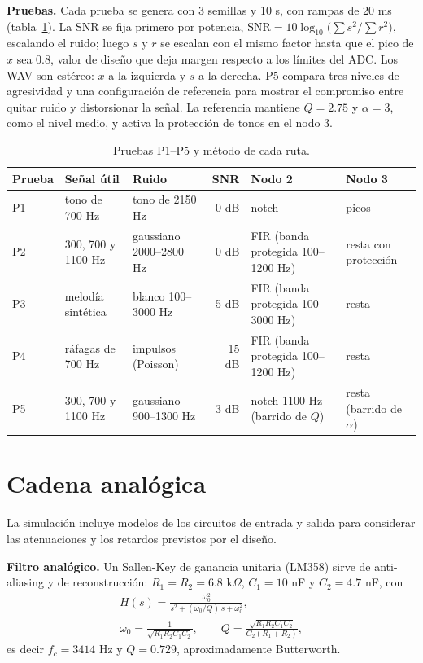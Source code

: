 \documentclass[10pt,a4paper,twocolumn]{article}
\begin{document}
\textbf{Pruebas.} Cada prueba se genera con 3 semillas y 10 s, con rampas de 20 ms (tabla~\ref{tab:pruebas}). La SNR se fija primero por potencia, $\text{SNR}=10\log_{10}\big(\sum s^2/\sum r^2\big)$, escalando el ruido; luego $s$ y $r$ se escalan con el mismo factor hasta que el pico de $x$ sea 0.8, valor de diseño que deja margen respecto a los límites del ADC. Los WAV son estéreo: $x$ a la izquierda y $s$ a la derecha. P5 compara tres niveles de agresividad y una configuración de referencia para mostrar el compromiso entre quitar ruido y distorsionar la señal. La referencia mantiene $Q=2.75$ y $\alpha=3$, como el nivel medio, y activa la protección de tonos en el nodo 3.
\begin{table}[!t]\centering\caption{Pruebas P1--P5 y método de cada ruta.}\label{tab:pruebas}\footnotesize\setlength{\tabcolsep}{4pt}
\begin{tabular}{lllrll}\toprule Prueba & Señal útil & Ruido & SNR & Nodo 2 & Nodo 3\\\midrule
P1 & tono de 700 Hz & tono de 2150 Hz & 0 dB & notch & picos\\
P2 & 300, 700 y 1100 Hz & gaussiano 2000--2800 Hz & 0 dB & FIR (banda protegida 100--1200 Hz) & resta con protección\\
P3 & melodía sintética & blanco 100--3000 Hz & 5 dB & FIR (banda protegida 100--3000 Hz) & resta\\
P4 & ráfagas de 700 Hz & impulsos (Poisson) & 15 dB & FIR (banda protegida 100--1200 Hz) & resta\\
P5 & 300, 700 y 1100 Hz & gaussiano 900--1300 Hz & 3 dB & notch 1100 Hz (barrido de $Q$) & resta (barrido de $\alpha$)\\\bottomrule\end{tabular}\end{table}

\section{Cadena analógica}\label{sec:analogica}
La simulación incluye modelos de los circuitos de entrada y salida para considerar las atenuaciones y los retardos previstos por el diseño.

\textbf{Filtro analógico.} Un Sallen-Key de ganancia unitaria (LM358) sirve de anti-aliasing y de reconstrucción: $R_1 = R_2 = 6.8$ k$\Omega$, $C_1 = 10$ nF y $C_2 = 4.7$ nF, con
\begin{gather}
H(s)=\frac{\omega_0^2}{s^2+(\omega_0/Q)\,s+\omega_0^2},\\
\omega_0=\frac{1}{\sqrt{R_1R_2C_1C_2}},\qquad Q=\frac{\sqrt{R_1R_2C_1C_2}}{C_2(R_1+R_2)},
\end{gather}
es decir $f_c = 3414$ Hz y $Q = 0.729$, aproximadamente Butterworth.
\end{document}
